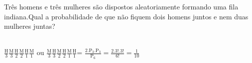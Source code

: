 \begin{ex}
 Três homens e três mulheres são dispostos aleatoriamente formando uma fila indiana.Qual a probabilidade de que não fiquem dois homens juntos e nem duas mulheres juntas?

  \begin{sol}
      \phantom{A} \\
    $\frac{\mathrm{H}}{3} \frac{\mathrm{M}}{3} \frac{\mathrm{H}}{2}\frac{\mathrm{M}}{2} \frac{\mathrm{H}}{1} \frac{\mathrm{M}}{1}$ ou $\frac{\mathrm{M}}{3} \frac{\mathrm{H}}{3} \frac{\mathrm{M}}{2} \frac{\mathrm{H}}{2}
    \frac{\mathrm{M}}{1} \frac{\mathrm{H}}{1} $= 
  $ \frac{2.\mathrm{P}_3.\mathrm{P}_3}{\mathrm{P}_6}= \frac{2.3!.3!}{6!}= \frac{1}{10}$
  \end{sol}
  \end{ex}